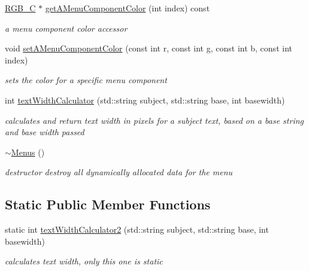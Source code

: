 \begin{DoxyCompactItemize}
\hypertarget{class_menus_a851624da61a43ff41381915e77d52542}{}\label{class_menus_a851624da61a43ff41381915e77d52542} 
\hyperlink{struct_r_g_b___c}{R\+G\+B\+\_\+C} $\ast$ \hyperlink{class_menus_a851624da61a43ff41381915e77d52542}{get\+A\+Menu\+Component\+Color} (int index) const
\begin{DoxyCompactList}\small\item\em a menu component color accessor \end{DoxyCompactList}\item 
\hypertarget{class_menus_adb7cbb1b3a40a33c934e7a59e561c822}{}\label{class_menus_adb7cbb1b3a40a33c934e7a59e561c822} 
void \hyperlink{class_menus_adb7cbb1b3a40a33c934e7a59e561c822}{set\+A\+Menu\+Component\+Color} (const int r, const int g, const int b, const int index)
\begin{DoxyCompactList}\small\item\em sets the color for a specific menu component \end{DoxyCompactList}\item 
\hypertarget{class_menus_a2e47a0621fa3ab517b05582863b40c6c}{}\label{class_menus_a2e47a0621fa3ab517b05582863b40c6c} 
int \hyperlink{class_menus_a2e47a0621fa3ab517b05582863b40c6c}{text\+Width\+Calculator} (std\+::string subject, std\+::string base, int basewidth)
\begin{DoxyCompactList}\small\item\em calculates and return text width in pixels for a subject text, based on a base string and base width passed \end{DoxyCompactList}\item 
\hypertarget{class_menus_aa6cea19ab085cb4d3b4c81220884a42d}{}\label{class_menus_aa6cea19ab085cb4d3b4c81220884a42d} 
\hyperlink{class_menus_aa6cea19ab085cb4d3b4c81220884a42d}{$\sim$\+Menus} ()
\begin{DoxyCompactList}\small\item\em destructor destroy all dynamically allocated data for the menu \end{DoxyCompactList}\end{DoxyCompactItemize}
\subsection*{Static Public Member Functions}
\begin{DoxyCompactItemize}
\item 
\hypertarget{class_menus_a565d4625b29adac73f73e6ccf2f9d90d}{}\label{class_menus_a565d4625b29adac73f73e6ccf2f9d90d} 
static int \hyperlink{class_menus_a565d4625b29adac73f73e6ccf2f9d90d}{text\+Width\+Calculator2} (std\+::string subject, std\+::string base, int basewidth)
\begin{DoxyCompactList}\small\item\em calculates text width, only this one is static \end{DoxyCompactList}\end{DoxyCompactItemize}
